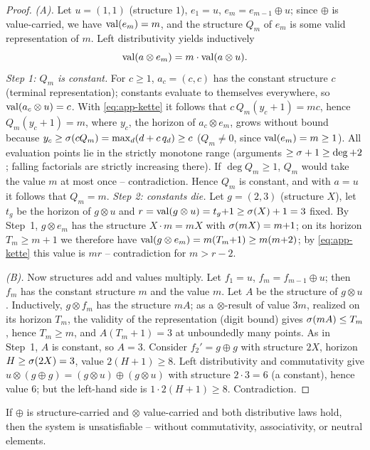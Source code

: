 \begin{proof}
\emph{(A).} Let $u=(1,1)$ (structure $1$), $e_1=u$,
$e_m=e_{m-1}\oplus u$; since $\oplus$ is value-carried, we have
$\operatorname{val}(e_m)=m$, and the structure $Q_m$ of $e_m$ is some valid
representation of $m$. Left distributivity yields inductively
\begin{equation}\label{eq:app-kette}
\operatorname{val}(a\otimes e_m)=m\cdot\operatorname{val}(a\otimes u).
\end{equation}
\emph{Step 1: $Q_m$ is constant.} For $c\ge1$, $a_c=(c,c)$ has
the constant structure $c$ (terminal representation); constants
evaluate to themselves everywhere, so $\operatorname{val}(a_c\otimes u)=c$. With
\eqref{eq:app-kette} it follows that $c\,Q_m(y_c{+}1)=mc$, hence
$Q_m(y_c{+}1)=m$, where $y_c$, the horizon of $a_c\otimes e_m$,
grows without bound because
$y_c\ge\sigma(cQ_m)=\max_d(d+c\,q_d)\ge c$
($Q_m\ne0$, since $\operatorname{val}(e_m)=m\ge1$).
All evaluation points lie in the strictly monotone range
(arguments $\ge\sigma+1\ge\deg+2$; falling factorials are
strictly increasing there). If $\deg Q_m\ge1$, $Q_m$ would take
the value $m$ at most once -- contradiction. Hence $Q_m$ is
constant, and with $a=u$ it follows that $Q_m=m$.
\emph{Step 2: constants die.} Let $g=(2,3)$ (structure $X$), let
$t_g$ be the horizon of $g\otimes u$ and
$r=\operatorname{val}(g\otimes u)=t_g{+}1\ge\sigma(X)+1=3$ fixed. By
Step~1, $g\otimes e_m$ has the structure $X\cdot m=mX$ with
$\sigma(mX)=m{+}1$; on its horizon $T_m\ge m{+}1$ we therefore
have $\operatorname{val}(g\otimes e_m)=m(T_m{+}1)\ge m(m{+}2)$; by
\eqref{eq:app-kette} this value is $mr$ -- contradiction for
$m>r-2$.

\emph{(B).} Now structures add and values multiply. Let $f_1=u$,
$f_m=f_{m-1}\oplus u$; then $f_m$ has the constant structure $m$
and the value $m$. Let $A$ be the structure of $g\otimes u$.
Inductively, $g\otimes f_m$ has the structure $mA$; as a
$\otimes$-result of value $3m$, realized on its horizon $T_m$,
the validity of the representation (digit bound) gives
$\sigma(mA)\le T_m$, hence $T_m\ge m$, and
$A(T_m{+}1)=3$ at unboundedly many points. As in Step~1, $A$ is
constant, so $A=3$. Consider $f_2'=g\oplus g$ with structure
$2X$, horizon $H\ge\sigma(2X)=3$, value $2(H{+}1)\ge8$.
Left distributivity and commutativity give
$u\otimes(g\oplus g)=(g\otimes u)\oplus(g\otimes u)$ with
structure $2\cdot3=6$ (a constant), hence value $6$; but the
left-hand side is $1\cdot2(H{+}1)\ge8$. Contradiction.
\end{proof}

\begin{satz}
If $\oplus$ is structure-carried and $\otimes$ value-carried and
both distributive laws hold, then the system is unsatisfiable --
without commutativity, associativity, or neutral elements.
\end{satz}

